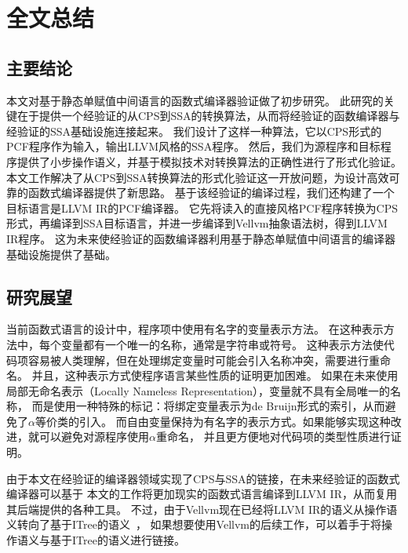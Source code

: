 
\chapter{全文总结} \label{ch:summary}

\section{主要结论}

本文对基于静态单赋值中间语言的函数式编译器验证做了初步研究。
此研究的关键在于提供一个经验证的从CPS到SSA的转换算法，从而将经验证的函数编译器与经验证的SSA基础设施连接起来。
我们设计了这样一种算法，它以CPS形式的PCF程序作为输入，输出LLVM风格的SSA程序。
然后，我们为源程序和目标程序提供了小步操作语义，并基于模拟技术对转换算法的正确性进行了形式化验证。
本文工作解决了从CPS到SSA转换算法的形式化验证这一开放问题，为设计高效可靠的函数式编译器提供了新思路。
基于该经验证的编译过程，我们还构建了一个目标语言是LLVM IR的PCF编译器。
它先将读入的直接风格PCF程序转换为CPS形式，再编译到SSA目标语言，并进一步编译到Vellvm抽象语法树，得到LLVM IR程序。
这为未来使经验证的函数编译器利用基于静态单赋值中间语言的编译器基础设施提供了基础。

\section{研究展望}

当前函数式语言的设计中，程序项中使用有名字的变量表示方法。
在这种表示方法中，每个变量都有一个唯一的名称，通常是字符串或符号。
这种表示方法使代码项容易被人类理解，但在处理绑定变量时可能会引入名称冲突，需要进行重命名。
并且，这种表示方式使程序语言某些性质的证明更加困难。
如果在未来使用局部无命名表示（Locally Nameless Representation），变量就不具有全局唯一的名称，
而是使用一种特殊的标记：将绑定变量表示为de Bruijn形式的索引，从而避免了$\alpha$等价类的引入。
而自由变量保持为有名字的表示方式。如果能够实现这种改进，就可以避免对源程序使用$\alpha$重命名，
并且更方便地对代码项的类型性质进行证明。

由于本文在经验证的编译器领域实现了CPS与SSA的链接，在未来经验证的函数式编译器可以基于
本文的工作将更加现实的函数式语言编译到LLVM IR，从而复用其后端提供的各种工具。
不过，由于Vellvm现在已经将LLVM IR的语义从操作语义转向了基于ITree的语义~\cite{itree2019,itreevellvm2021}，
如果想要使用Vellvm的后续工作，可以着手于将操作语义与基于ITree的语义进行链接。
